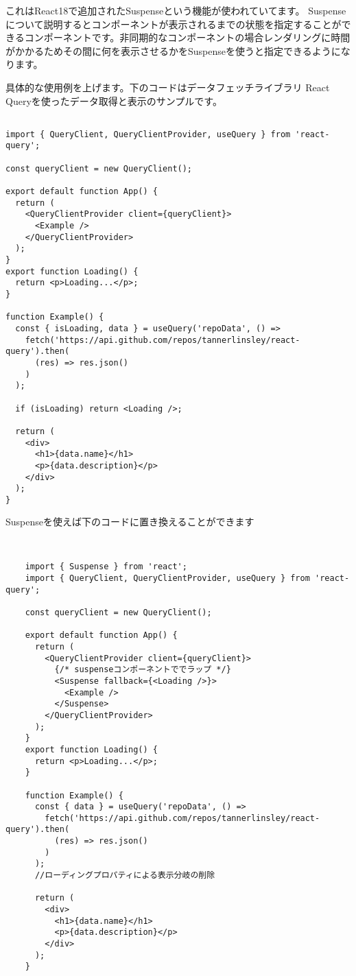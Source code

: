 これはReact18で追加されたSuspenseという機能が使われていてます。
Suspenseについて説明するとコンポーネントが表示されるまでの状態を指定することができるコンポーネントです。非同期的なコンポーネントの場合レンダリングに時間がかかるためその間に何を表示させるかをSuspenseを使うと指定できるようになります。

具体的な使用例を上げます。下のコードはデータフェッチライブラリ React Queryを使ったデータ取得と表示のサンプルです。


\begin{tcolorbox}[breakable]
  \begin{verbatim}
    
import { QueryClient, QueryClientProvider, useQuery } from 'react-query';

const queryClient = new QueryClient();

export default function App() {
  return (
    <QueryClientProvider client={queryClient}>
      <Example />
    </QueryClientProvider>
  );
}
export function Loading() {
  return <p>Loading...</p>;
}

function Example() {
  const { isLoading, data } = useQuery('repoData', () =>
    fetch('https://api.github.com/repos/tannerlinsley/react-query').then(
      (res) => res.json()
    )
  );

  if (isLoading) return <Loading />;

  return (
    <div>
      <h1>{data.name}</h1>
      <p>{data.description}</p>
    </div>
  );
}

  \end{verbatim}
\end{tcolorbox}


Suspenseを使えば下のコードに置き換えることができます

\begin{tcolorbox}[breakable]
  \begin{verbatim}


    import { Suspense } from 'react';
    import { QueryClient, QueryClientProvider, useQuery } from 'react-query';
    
    const queryClient = new QueryClient();
    
    export default function App() {
      return (
        <QueryClientProvider client={queryClient}>
          {/* suspenseコンポーネントででラップ */}
          <Suspense fallback={<Loading />}>
            <Example />
          </Suspense>
        </QueryClientProvider>
      );
    }
    export function Loading() {
      return <p>Loading...</p>;
    }
    
    function Example() {
      const { data } = useQuery('repoData', () =>
        fetch('https://api.github.com/repos/tannerlinsley/react-query').then(
          (res) => res.json()
        )
      );
      //ローディングプロパティによる表示分岐の削除
    
      return (
        <div>
          <h1>{data.name}</h1>
          <p>{data.description}</p>
        </div>
      );
    }
    
    
  \end{verbatim}
\end{tcolorbox}



